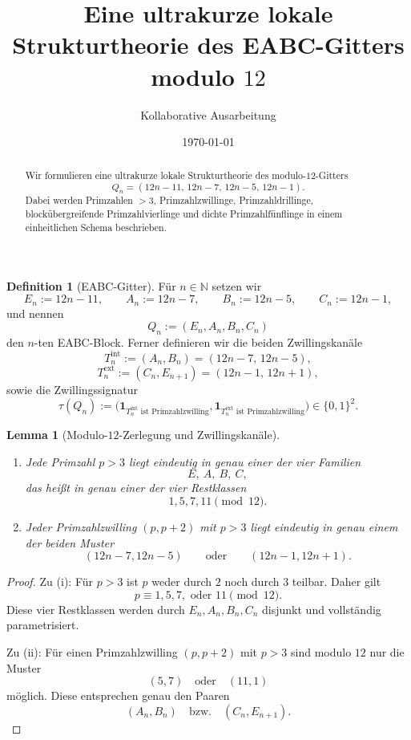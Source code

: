 \documentclass[11pt,a4paper]{article}
\title{Eine ultrakurze lokale Strukturtheorie des EABC-Gitters modulo \(12\)}
\author{Kollaborative Ausarbeitung}
\date{\today}
\newtheorem{lemma}[satz]{Lemma}
\theoremstyle{definition}
\newtheorem{definition}[satz]{Definition}
\theoremstyle{remark}
\newcommand{\N}{\mathbb{N}}
\newcommand{\ind}{\mathbf{1}}
\begin{document}
	\maketitle
	
	\begin{abstract}
		Wir formulieren eine ultrakurze lokale Strukturtheorie des modulo-\(12\)-Gitters
		\[
		Q_n=(12n-11,\,12n-7,\,12n-5,\,12n-1).
		\]
		Dabei werden Primzahlen \(>3\), Primzahlzwillinge, Primzahldrillinge,
		blockübergreifende Primzahlvierlinge und dichte Primzahlfünflinge in einem einheitlichen
		Schema beschrieben.
	\end{abstract}
	
	\begin{definition}[EABC-Gitter]
		Für \(n\in\N\) setzen wir
		\[
		E_n:=12n-11,\qquad
		A_n:=12n-7,\qquad
		B_n:=12n-5,\qquad
		C_n:=12n-1,
		\]
		und nennen
		\[
		Q_n:=(E_n,A_n,B_n,C_n)
		\]
		den \(n\)-ten EABC-Block. Ferner definieren wir die beiden Zwillingskanäle
		\[
		T_n^{\mathrm{int}}:=(A_n,B_n)=(12n-7,\,12n-5),
		\]
		\[
		T_n^{\mathrm{ext}}:=(C_n,E_{n+1})=(12n-1,\,12n+1),
		\]
		sowie die Zwillingssignatur
		\[
		\tau(Q_n):=
		\bigl(
		\ind_{T_n^{\mathrm{int}}\text{ ist Primzahlzwilling}},
		\ind_{T_n^{\mathrm{ext}}\text{ ist Primzahlzwilling}}
		\bigr)\in\{0,1\}^2.
		\]
	\end{definition}
	
	\begin{lemma}[Modulo-\(12\)-Zerlegung und Zwillingskanäle]
		\leavevmode
		\begin{enumerate}[label=\textup{(\roman*)}]
			\item Jede Primzahl \(p>3\) liegt eindeutig in genau einer der vier Familien
			\[
			E,\ A,\ B,\ C,
			\]
			das heißt in genau einer der vier Restklassen
			\[
			1,5,7,11 \pmod{12}.
			\]
			\item Jeder Primzahlzwilling \((p,p+2)\) mit \(p>3\) liegt eindeutig in genau einem der beiden Muster
			\[
			(12n-7,12n-5)
			\qquad\text{oder}\qquad
			(12n-1,12n+1).
			\]
		\end{enumerate}
	\end{lemma}
	
	\begin{proof}
		Zu \textup{(i)}: Für \(p>3\) ist \(p\) weder durch \(2\) noch durch \(3\) teilbar. Daher gilt
		\[
		p\equiv 1,5,7,\text{ oder }11 \pmod{12}.
		\]
		Diese vier Restklassen werden durch \(E_n,A_n,B_n,C_n\) disjunkt und vollständig parametrisiert.
		
		Zu \textup{(ii)}: Für einen Primzahlzwilling \((p,p+2)\) mit \(p>3\) sind modulo \(12\) nur die Muster
		\[
		(5,7)\quad\text{oder}\quad(11,1)
		\]
		möglich. Diese entsprechen genau den Paaren
		\[
		(A_n,B_n)\quad\text{bzw.}\quad(C_n,E_{n+1}).
		\]
	\end{proof}
	
\end{document}
